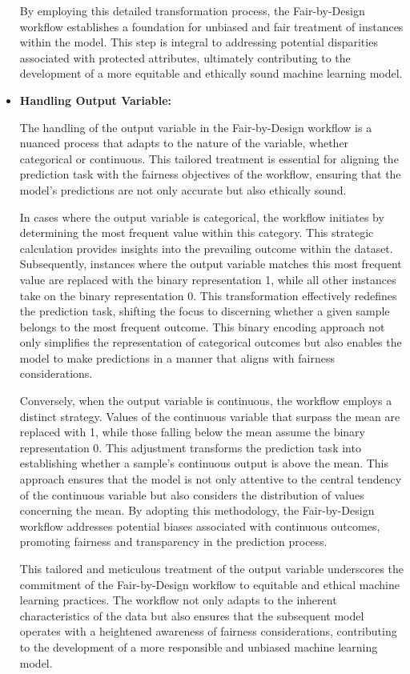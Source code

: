 \documentclass[12pt,a4paper,openright,twoside]{book}
\begin{document}
\begin{itemize}
    By employing this detailed transformation process, the Fair-by-Design workflow establishes a foundation for unbiased and fair treatment of instances within the model. This step is integral to addressing potential disparities associated with protected attributes, ultimately contributing to the development of a more equitable and ethically sound machine learning model.
    
    \item \textbf{Handling Output Variable:} 
    
    The handling of the output variable in the Fair-by-Design workflow is a nuanced process that adapts to the nature of the variable, whether categorical or continuous. This tailored treatment is essential for aligning the prediction task with the fairness objectives of the workflow, ensuring that the model's predictions are not only accurate but also ethically sound.

    In cases where the output variable is categorical, the workflow initiates by determining the most frequent value within this category. This strategic calculation provides insights into the prevailing outcome within the dataset. Subsequently, instances where the output variable matches this most frequent value are replaced with the binary representation 1, while all other instances take on the binary representation 0. This transformation effectively redefines the prediction task, shifting the focus to discerning whether a given sample belongs to the most frequent outcome. This binary encoding approach not only simplifies the representation of categorical outcomes but also enables the model to make predictions in a manner that aligns with fairness considerations.

    Conversely, when the output variable is continuous, the workflow employs a distinct strategy. Values of the continuous variable that surpass the mean are replaced with 1, while those falling below the mean assume the binary representation 0. This adjustment transforms the prediction task into establishing whether a sample's continuous output is above the mean. This approach ensures that the model is not only attentive to the central tendency of the continuous variable but also considers the distribution of values concerning the mean. By adopting this methodology, the Fair-by-Design workflow addresses potential biases associated with continuous outcomes, promoting fairness and transparency in the prediction process.

    This tailored and meticulous treatment of the output variable underscores the commitment of the Fair-by-Design workflow to equitable and ethical machine learning practices. The workflow not only adapts to the inherent characteristics of the data but also ensures that the subsequent model operates with a heightened awareness of fairness considerations, contributing to the development of a more responsible and unbiased machine learning model.

\end{itemize}
\end{document}
